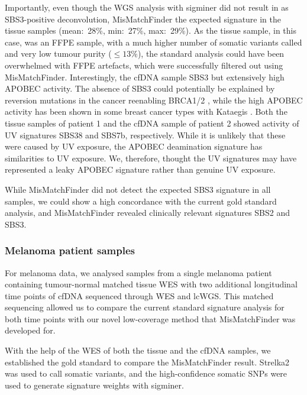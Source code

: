 Importantly, even though the WGS analysis with sigminer did not result in as SBS3-positive deconvolution, MisMatchFinder  the expected signature in the tissue samples (mean:~28\%, min:~27\%, max:~29\%). As the tissue sample, in this case, was an FFPE sample, with a much higher number of somatic variants called and very low tumour purity ($\leq 13\%$), the standard analysis could have been overwhelmed with FFPE artefacts, which were successfully filtered out using MisMatchFinder. Interestingly, the cfDNA sample  SBS3 but extensively high APOBEC activity. The absence of SBS3 could potentially be explained by reversion mutations in the cancer reenabling BRCA1/2 \cite{Lin2018a}, while the high APOBEC activity has been shown in some breast cancer types with Kataegis \cite{Alexandrov2020,Rebhandl2015}. Both the tissue samples of patient 1 and the cfDNA sample of patient 2 showed activity of UV signatures SBS38 and SBS7b, respectively. While it is unlikely that these were caused by UV exposure, the APOBEC deamination signature has similarities to UV exposure. We, therefore, thought the UV signatures may have represented a leaky APOBEC signature rather than genuine UV exposure.

While MisMatchFinder did not detect the expected SBS3 signature in all samples, we could show a high concordance with the current gold standard analysis, and MisMatchFinder revealed clinically relevant signatures SBS2 and SBS3. 

\subsubsection{Melanoma patient samples}
\label{mmf-sec:melpatients}

For  melanoma data, we analysed samples from a single melanoma patient containing tumour-normal matched tissue WES with two additional longitudinal time points of cfDNA sequenced through WES and lcWGS. This matched sequencing allowed us to compare the current standard signature analysis for both time points with our novel low-coverage method that MisMatchFinder was developed for.

With the help of the WES of both the tissue and the cfDNA samples, we established the gold standard to compare the MisMatchFinder result.  Strelka2 was used to call somatic variants, and the high-confidence somatic SNPs were used to generate signature weights with sigminer.

